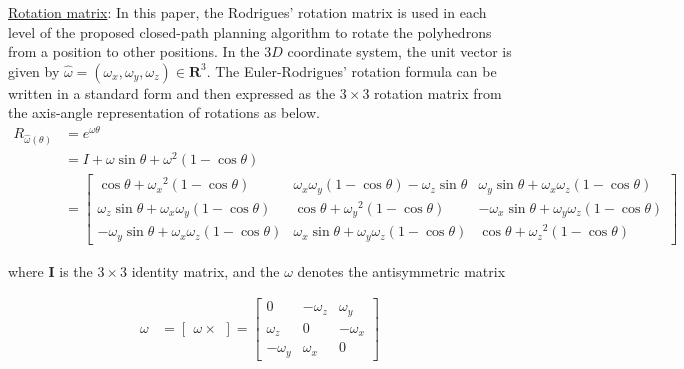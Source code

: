 %
\noindent \uline{Rotation matrix}: 
In this paper, the Rodrigues' rotation matrix \cite{Dai_Rodrigues_2015} is used in each level of the proposed closed-path planning algorithm to rotate the polyhedrons from a position to other positions.
%
In the $3D$ coordinate system, the unit vector is given by $\hat{\omega}=(\omega_x,\omega_y,\omega_z)\in{\textbf{R}^3}$.
The Euler-Rodrigues' rotation formula can be written in a standard form and then expressed as the $3\times3$ rotation matrix from the axis-angle representation of rotations as below.
\begin{equation}
\begin{split}
R_{\hat{\omega}(\theta)} &= {e^{\omega\theta}}\\
	&= I + \omega\sin{\theta} + {\omega}^2(1-\cos{\theta})\\
	&= {
		\begin{bmatrix}
			{\cos{\theta}+{\omega_x}^2(1-\cos{\theta})} & {\omega_x\omega_y(1-\cos{\theta})-\omega_z{\sin\theta}} & {\omega_y\sin{\theta}+\omega_x\omega_z(1-\cos{\theta})}\\
			{\omega_z\sin{\theta}+\omega_x\omega_y(1-\cos{\theta})} & {\cos{\theta}+{\omega_y}^2(1-\cos{\theta})} & {-\omega_x\sin{\theta}+\omega_y\omega_z(1-\cos{\theta})}\\
			{-\omega_y\sin{\theta}+\omega_x\omega_z(1-\cos{\theta})} & {\omega_x\sin{\theta}+\omega_y\omega_z(1-\cos{\theta})} & {\cos{\theta}+{\omega_z}^2(1-\cos{\theta})}
		\end{bmatrix}
		}
\end{split}
\end{equation}

where \textbf{I} is the $3\times3$ identity matrix, and the $\omega$ denotes the antisymmetric matrix 

\begin{equation*}
\begin{split}
\omega &= {
		\begin{bmatrix}
			\omega\times
		\end{bmatrix}
		}
		= {
		\begin{bmatrix}
			0 & -\omega_z & \omega_y \\
			\omega_z & 0 & -\omega_x \\
			-\omega_y & \omega_x & 0
		\end{bmatrix}
		}
\end{split}
\end{equation*}

